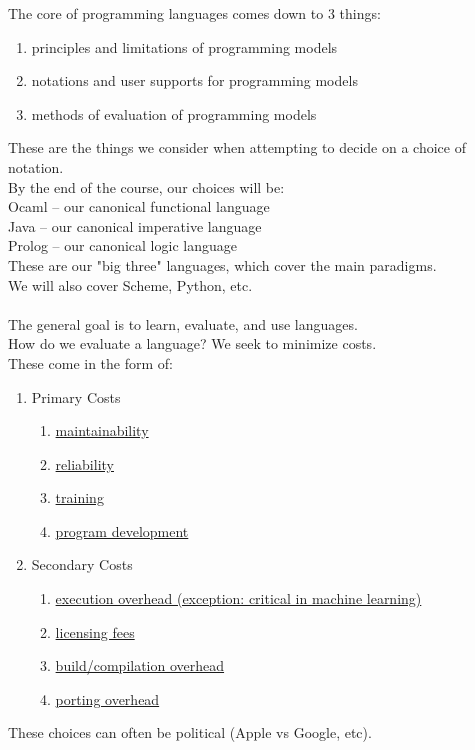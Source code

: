 \documentclass[../../lecture_notes.tex]{subfiles}
\begin{document}
\noindent The core of programming languages comes down to 3 things: 
\begin{enumerate}[itemsep=0mm]
	\item principles and limitations of programming models
	\item notations and user supports for programming models
	\item methods of evaluation of programming models
\end{enumerate}
These are the things we consider when attempting to decide on a choice of notation.\\
By the end of the course, our choices will be:\\
	\indent Ocaml -- our canonical functional language\\
	\indent Java -- our canonical imperative language\\
	\indent Prolog -- our canonical logic language\\
These are our "big three" languages, which cover the main paradigms. \\
We will also cover Scheme, Python, etc. \\
\\
The general goal is to learn, evaluate, and use languages.\\
How do we evaluate a language? We seek to minimize costs.\\
These come in the form of: \begin{enumerate}[itemsep=0mm]
	\item Primary Costs 
		\begin{enumerate}[itemsep=0mm]
			\item \underline{maintainability}
			\item \underline{reliability}
			\item \underline{training}
			\item \underline{program development}
		\end{enumerate}
	\item Secondary Costs
		\begin{enumerate}[itemsep=0mm]
			\item \underline{execution overhead (exception: critical in machine learning)}
			\item \underline{licensing fees}
			\item \underline{build/compilation overhead}
			\item \underline{porting overhead}
		\end{enumerate}
\end{enumerate} These choices can often be political (Apple vs Google, etc).\\
\end{document}
